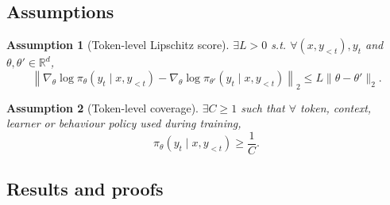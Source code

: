 \documentclass[10pt]{article}
\newcommand{\grad}{\nabla}
\theoremstyle{preserved}
\newtheorem{assumption}{Assumption}
\begin{document}
\subsection*{Assumptions}

\begin{assumption}[Token-level Lipschitz score] $\exists L>0$ s.t. $\forall(x,y_{<t}),y_t$ and $\theta,\theta'\in\mathbb{R}^d$,
\begin{equation*}
\left\|\grad_\theta\log\pi_\theta(y_t\mid x,y_{<t})-\grad_\theta\log\pi_{\theta'}(y_t\mid x,y_{<t})\right\|_2\le L\|\theta-\theta'\|_2.
\end{equation*}
\end{assumption}
\begin{assumption}[Token-level coverage] $\exists C\ge1$ such that $\forall$ token, context, learner or behaviour policy used during training,
\begin{equation*}
\pi_\theta(y_t\mid x,y_{<t})\ge\frac1C.
\end{equation*}

\end{assumption}

\subsection*{Results and proofs}
\end{document}
